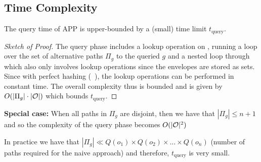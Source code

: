 \documentclass[a4paper]{report}
\begin{document}
\subsection{Time Complexity}
\label{sec:complexity_app}
\begin{lemma}
The query time of APP is upper-bounded by a (small) time limit $t_{\textrm {query}}$.
\label{lemma1}
\end{lemma}
\begin{proof}[Sketch of Proof]
The query phase includes a lookup operation on \calM, running a loop over the set of alternative paths $\Pi_g$ to the queried $g$ and a nested loop through \calO which also only involves lookup operations since the envelopes are stored as sets. Since with perfect hashing (~\cite{czech1997perfect}), the lookup operations can be performed in constant time. The overall complexity thus is bounded and is given by $O(|\Pi_g|\cdot |\mathcal{O}|)$ which bounds $t_{\textrm {query}}$.
\end{proof}

\textbf{Special case:} When all paths in $\Pi_g$ are disjoint, then we have that $|\Pi_g| \leq n+1$ and so the complexity of the query phase becomes $O(|\mathcal{O}|^2)$

In practice we have that $|\Pi_g| \ll Q(o_1) \times Q(o_2) \times ... \times Q(o_n)$ (number of paths required for the naive approach) and therefore, $t_{\textrm {query}}$ is very small.
\end{document}
